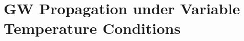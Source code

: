 
\chapter[GW Propagation under Variable Temperature Conditions]{GW Propagation under Variable Temperature Conditions}
\label{ch:tempEffects}




%
%
%
%